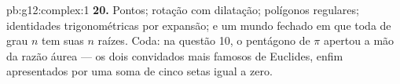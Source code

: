 \begin{solution}{pb:g12:complex:1}
\textbf{20.} Pontos; rotação com dilatação; polígonos
regulares; identidades trigonométricas por expansão; e um mundo
fechado em que toda  de grau $n$ tem suas $n$ raízes.
Coda: na questão 10, o pentágono de $\pi$ apertou a mão da razão
áurea --- os dois convidados mais famosos de Euclides, enfim
apresentados por uma soma de cinco setas igual a zero.
\end{solution}
